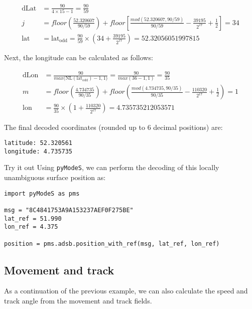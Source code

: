 \begin{align}
    \mathrm{dLat} &= \frac{90}{4 \times 15 - 1} = \frac{90}{59} \\
    j &= floor \left( \frac{52.320607}{90/59} \right) + floor \left[ \frac{mod(52.320607, 90/59)}{90/59} - \frac{39195}{2^{17}}  + \frac{1}{2} \right] = 34 \\
    \mathrm{lat} &= \mathrm{lat}_\mathrm{odd} = \frac{90}{59} \times \left( 34 + \frac{39195}{2^{17}} \right) = 52.32056051997815
\end{align}
  
Next, the longitude can be calculated as follows:
  
\begin{align}
    \mathrm{dLon} &= \frac{90}{max \Big( \mathrm{NL}(\mathrm{lat}_\mathrm{odd})-1, 1 \Big)} = \frac{90}{max(36-1, 1)} = \frac{90}{35} \\
    m &= floor \left( \frac{4.734735}{90/35} \right) + floor \left( \frac{mod(4.734735, 90/35)}{90/35} - \frac{110320}{2^{17}}  + \frac{1}{2}  \right) = 1 \\
    \mathrm{lon} &= \frac{90}{35} \times \left(1 + \frac{110320}{2^{17}} \right) = 4.735735212053571
\end{align}


The final decoded coordinates (rounded up to 6 decimal positions) are:

\begin{verbatim}
latitude: 52.320561
longitude: 4.735735
\end{verbatim}

\begin{notebox}{Try it out}
Using \texttt{pyModeS}, we can perform the decoding of this locally unambiguous surface position as: 

\begin{verbatim}
import pyModeS as pms

msg = "8C4841753A9A153237AEF0F275BE"
lat_ref = 51.990
lon_ref = 4.375

position = pms.adsb.position_with_ref(msg, lat_ref, lon_ref)
\end{verbatim}

\end{notebox}


\subsection{Movement and track}

As a continuation of the previous example, we can also calculate the speed and track angle from the movement and track fields.

